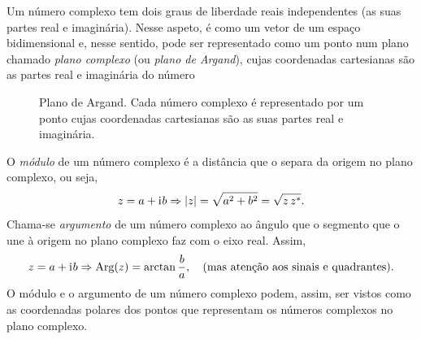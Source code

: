 Um número complexo tem dois graus de liberdade reais independentes (as suas
partes real e imaginária). Nesse aspeto, é como um vetor de um espaço
bidimensional e, nesse sentido, pode ser representado como um ponto num plano
chamado \emph{plano complexo} (ou \emph{plano de Argand}), cujas coordenadas
cartesianas são as partes real e imaginária do número
\begin{figure}[htb]
  {\centering
    \par
  }
  \caption{Plano de Argand. Cada número complexo é representado por um ponto
    cujas coordenadas cartesianas são as suas partes real e
  imaginária.\label{fig:argplane}}
\end{figure}
O \emph{módulo} de um número complexo é a distância que o separa da origem no
plano complexo, ou seja,
\begin{equation*}
   z = a+\text{i}\mkern1mu b \Rightarrow | z|= \sqrt{a^2+b^2}=\sqrt{z\,z^*}.
\end{equation*}
Chama-se \emph{argumento} de um número complexo ao ângulo que o segmento que o
une à origem no plano complexo faz com o eixo real. Assim,
\begin{equation*}
   z = a+\text{i}\mkern1mu b \Rightarrow \text{Arg}( z)=\arctan\frac{b}{a},\quad
  \text{(mas atenção aos sinais e quadrantes).}
\end{equation*}
O módulo e o argumento de um número complexo podem, assim, ser vistos como as
coordenadas polares dos pontos que representam os números complexos no plano
complexo.


